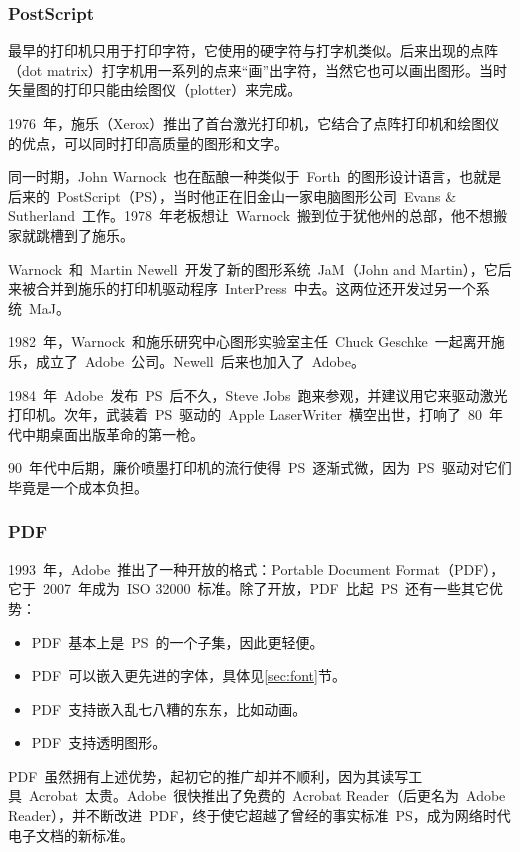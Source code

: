 \subsubsection{PostScript}
最早的打印机只用于打印字符，它使用的硬字符与打字机类似。后来出现的点阵（dot matrix）打字机用一系列的点来“画”出字符，当然它也可以画出图形。当时矢量图的打印只能由绘图仪（plotter）来完成。

1976~年，施乐（Xerox）推出了首台激光打印机，它结合了点阵打印机和绘图仪的优点，可以同时打印高质量的图形和文字。

同一时期，John Warnock~也在酝酿一种类似于~Forth~的图形设计语言，也就是后来的~PostScript（PS），当时他正在旧金山一家电脑图形公司~Evans \& Sutherland~工作。1978~年老板想让~Warnock~搬到位于犹他州的总部，他不想搬家就跳槽到了施乐。

Warnock~和~Martin Newell~开发了新的图形系统~JaM（John and Martin），它后来被合并到施乐的打印机驱动程序~InterPress~中去。这两位还开发过另一个系统~MaJ。

1982~年，Warnock~和施乐研究中心图形实验室主任~Chuck Geschke~一起离开施乐，成立了~Adobe~公司。Newell~后来也加入了~Adobe。

1984~年~Adobe~发布~PS~后不久，Steve Jobs~跑来参观，并建议用它来驱动激光打印机。次年，武装着~PS~驱动的~Apple LaserWriter~横空出世，打响了~80~年代中期桌面出版革命的第一枪。

90~年代中后期，廉价喷墨打印机的流行使得~PS~逐渐式微，因为~PS~驱动对它们毕竟是一个成本负担。

\subsubsection{PDF}
1993~年，Adobe~推出了一种开放的格式：Portable Document Format（PDF），它于~2007~年成为~ISO 32000~标准。除了开放，PDF~比起~PS~还有一些其它优势：
\begin{itemize}
    \item PDF~基本上是~PS~的一个子集，因此更轻便。
    \item PDF~可以嵌入更先进的字体，具体见\ref{sec:font}节。
    \item PDF~支持嵌入乱七八糟的东东，比如动画。
    \item PDF~支持透明图形。
\end{itemize}

PDF~虽然拥有上述优势，起初它的推广却并不顺利，因为其读写工具~Acrobat~太贵。Adobe~很快推出了免费的~Acrobat Reader（后更名为~Adobe Reader），并不断改进~PDF，终于使它超越了曾经的事实标准~PS，成为网络时代电子文档的新标准。

